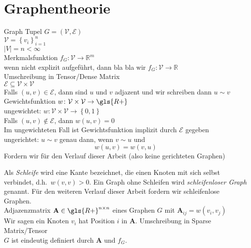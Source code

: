 \section{Graphentheorie}

Graph Tupel $G = \left(\mathcal{V}, \mathcal{E}\right)$\\
$\mathcal{V} = {\left\{ v_i \right\}}^n_{i=1}$\\
$\left| V \right| = n < \infty$\\
Merkmalsfunktion $f_G \colon \mathcal{V} \to \mathbb{R}^m$\\
wenn nicht explizit aufgeführt, dann bla bla wir $f_G \colon \mathcal{V} \to \mathbb{R}$\\
Umschreibung in Tensor/Dense Matrix\\
$\mathcal{E} \subseteq \mathcal{V} \times \mathcal{V}$\\
Falls $\left( u, v \right) \in \mathcal{E}$, dann sind $u$ und $v$ adjazent und wir schreiben dann $u \sim v$\\
Gewichtsfunktion $w \colon \mathcal{V} \times \mathcal{V} \to \gls{R+}$\\
ungewichtet: $w \colon \mathcal{V} \times \mathcal{V} \to \left\{ 0, 1 \right\}$\\
Falls $\left( u, v \right) \notin \mathcal{E}$, dann $w\left(u, v\right) = 0$\\
Im ungewichteten Fall ist Gewichtsfunktion implizit durch $\mathcal{E}$ gegeben\\

ungerichtet:
$u \sim v$ genau dann, wenn $v \sim u$ und
\begin{equation}
  w\left(u, v\right) = w\left(v, u\right)
\end{equation}
Fordern wir für den Verlauf dieser Arbeit (also keine gerichteten Graphen)

Als \emph{Schleife} wird eine Kante bezeichnet, die einen Knoten mit sich selbst verbindet, d.h.\ $w\left(v, v\right) > 0$.
Ein Graph ohne Schleifen wird \emph{schleifenloser Graph} genannt.
Für den weiteren Verlauf dieser Arbeit fordern wir schleifenlose Graphen.\\

Adjazenzmatrix $\mathbf{A} \in \gls{R+}^{n \times n}$ eines Graphen $G$ mit $\mathbf{A}_{ij} = w(v_i, v_j)$\\
Wir sagen ein Knoten $v_i$ hat Position $i$ in $\mathbf{A}$.
Umschreibung in Sparse Matrix/Tensor\\

$G$ ist eindeutig definiert durch $\mathbf{A}$ und $f_G$.

